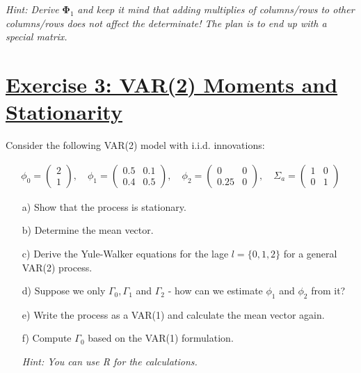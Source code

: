 \documentclass[12pt,a4paper]{article}
\newcommand{\tmpsection}[1]{}
\let\tmpsection=\section
\renewcommand{\section}[1]{\tmpsection{\underline{#1}} }
\begin{document}
\emph{Hint: Derive} \(\pmb{\Phi}_1\) \emph{and keep it mind that adding
multiplies of columns/rows to other columns/rows does not affect the
determinate! The plan is to end up with a special matrix.}

\hypertarget{exercise-3-var2-moments-and-stationarity}{%
\section{Exercise 3: VAR(2) Moments and
Stationarity}\label{exercise-3-var2-moments-and-stationarity}}

Consider the following VAR(2) model with i.i.d. innovations:

\begin{align*}
    \phi_0 = \begin{pmatrix} 2 \\ 1 \end{pmatrix}, \quad \phi_1 = \begin{pmatrix} 0.5 & 0.1 \\ 0.4 & 0.5 \end{pmatrix}, \quad \phi_2 = \begin{pmatrix} 0 & 0 \\ 0.25 & 0 \end{pmatrix}, \quad \Sigma_a = \begin{pmatrix} 1 & 0 \\ 0 & 1 \end{pmatrix}
\end{align*}

\begin{itemize}
    \item[a)] Show that the process is stationary.
    \item[b)] Determine the mean vector.
    \item[c)] Derive the Yule-Walker equations for the lage $l = \{0,1,2 \}$ for a general VAR(2) process.
    \item[d)] Suppose we only $\Gamma_0 , \Gamma_1$ and $\Gamma_2$ - how can we estimate $\phi_1$ and $\phi_2$ from it?
    \item[e)] Write the process as a VAR(1) and calculate the mean vector again.
    \item[f)] Compute $\Gamma_0$ based on the VAR(1) formulation.
    \item[] \textit{Hint: You can use R for the calculations.}

\end{itemize}
\end{document}

